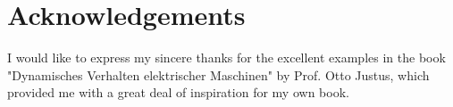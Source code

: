\chapter*{Acknowledgements}
I would like to express my sincere thanks for the excellent examples in the book "Dynamisches Verhalten elektrischer Maschinen" by Prof. Otto Justus, which provided me with a great deal of inspiration for my own book.
\newpage